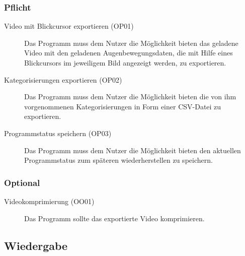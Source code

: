 \documentclass[a4paper]{scrartcl}
\begin{document}
    \subsubsection{Pflicht}
      \begin{description}
	\item[Video mit Blickcursor exportieren (OP01)] Das Programm muss dem Nutzer die Möglichkeit bieten das geladene Video mit den geladenen Augenbewegungsdaten, die mit Hilfe eines Blickcursors im jeweiligem Bild angezeigt werden, zu exportieren.
	\item[Kategorisierungen exportieren (OP02)] Das Programm muss dem Nutzer die Möglichkeit bieten die von ihm vorgenommenen Kategorisierungen in Form einer CSV-Datei zu exportieren.
	\item[Programmstatus speichern (OP03)] Das Programm muss dem Nutzer die Möglichkeit bieten den aktuellen Programmstatus zum späteren wiederherstellen zu speichern.
      \end{description}
    \subsubsection{Optional}
      \begin{description}
	\item[Videokomprimierung (OO01)] Das Programm sollte das exportierte Video komprimieren.
      \end{description}
  \subsection{Wiedergabe}
\end{document}
